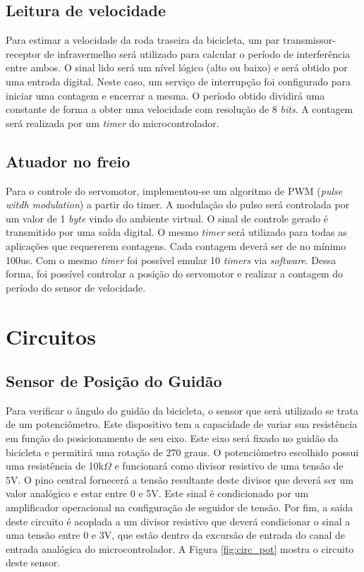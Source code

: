\subsection{Leitura de velocidade} %
\label{sub:read_vel_sens}

Para estimar a velocidade da roda traseira da bicicleta, um par transmissor-receptor de infravermelho será utilizado para calcular o período de interferência entre ambos. O sinal lido será um nível lógico (alto ou baixo)  e será obtido por uma entrada digital. Neste caso, um serviço de interrupção foi configurado para iniciar uma contagem e encerrar a mesma. O período obtido dividirá uma constante de forma a obter uma velocidade com resolução de 8 \textit{bits}. A contagem será realizada por um \textit{timer} do microcontrolador.

\subsection{Atuador no freio} %
\label{sub:read_freio_sens}

Para o controle do servomotor, implementou-se um algoritmo de PWM (\textit{pulse witdh modulation}) a partir do timer. A modulação do pulso será controlada por um valor de 1 \textit{byte} vindo do ambiente virtual. O sinal de controle gerado é transmitido por uma saída digital. O mesmo \textit{timer} será utilizado para todas as aplicações que requererem contagens. Cada contagem deverá ser de no mínimo 100us. Com o mesmo \textit{timer} foi possível emular 10 \textit{timers} via \textit{software}. Dessa forma, foi possível controlar a posição do servomotor e realizar a contagem do período do sensor de velocidade.

\section{Circuitos} %
\label{sec:circuito}

\subsection{Sensor de Posição do Guidão} %
\label{sub:poteciometro_guidao}

Para verificar o ângulo do guidão da bicicleta, o sensor que será utilizado se trata de um potenciômetro. Este dispositivo tem a capacidade de variar sua resistência em função do posicionamento de seu eixo. Este eixo será fixado no guidão da bicicleta e permitirá uma rotação de 270 graus. O potenciômetro escolhido possui uma resistência de 10k$\Omega$ e funcionará como divisor resistivo de uma tensão de 5V. O pino central fornecerá a tensão resultante deste divisor que deverá ser um valor analógico e estar entre 0 e 5V. Este sinal é condicionado por um amplificador operacional na configuração de seguidor de tensão. Por fim, a saída deste circuito é acoplada a um divisor resistivo que deverá condicionar o sinal a uma tensão entre 0 e 3V, que estão dentro da excursão de entrada do canal de entrada analógica do microcontrolador. A Figura \ref{fig:circ_pot} mostra o circuito deste sensor.

